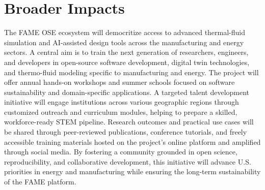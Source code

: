 \documentclass[11pt]{article}
\begin{document}

\section*{Broader Impacts}
\vspace{-3pt}
\noindent
The FAME OSE ecosystem will democritize access to advanced thermal-fluid simulation and AI-assisted design tools across the manufacturing and energy sectors. A central aim is to train the next generation of researchers, engineers, and developers in open-source software development, digital twin technologies, and thermo-fluid modeling specific to manufacturing and energy. The project will offer annual hands-on workshops and summer schools focused on software sustainability and domain-specific applications. A targeted talent development initiative will engage institutions across various geographic regions through customized outreach and curriculum modules, helping to prepare a skilled, workforce-ready STEM pipeline. Research outcomes and practical use cases will be shared through peer-reviewed publications, conference tutorials, and freely accessible training materials hosted on the project's online platform and amplified through social media. By fostering a community grounded in open science, reproducibility, and collaborative development, this initiative will advance U.S. priorities in energy and manufacturing while ensuring the long-term sustainability of the FAME platform.
\end{document}
